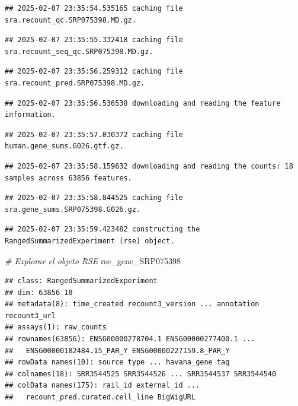 \documentclass[
]{article}
\newenvironment{Shaded}{\begin{snugshade}}{\end{snugshade}}
\newcommand{\CommentTok}[1]{\textcolor[rgb]{0.56,0.35,0.01}{\textit{#1}}}
\newcommand{\NormalTok}[1]{#1}
\begin{document}
\begin{verbatim}
## 2025-02-07 23:35:54.535165 caching file sra.recount_qc.SRP075398.MD.gz.
\end{verbatim}

\begin{verbatim}
## 2025-02-07 23:35:55.332418 caching file sra.recount_seq_qc.SRP075398.MD.gz.
\end{verbatim}

\begin{verbatim}
## 2025-02-07 23:35:56.259312 caching file sra.recount_pred.SRP075398.MD.gz.
\end{verbatim}

\begin{verbatim}
## 2025-02-07 23:35:56.536538 downloading and reading the feature information.
\end{verbatim}

\begin{verbatim}
## 2025-02-07 23:35:57.030372 caching file human.gene_sums.G026.gtf.gz.
\end{verbatim}

\begin{verbatim}
## 2025-02-07 23:35:58.159632 downloading and reading the counts: 18 samples across 63856 features.
\end{verbatim}

\begin{verbatim}
## 2025-02-07 23:35:58.844525 caching file sra.gene_sums.SRP075398.G026.gz.
\end{verbatim}

\begin{verbatim}
## 2025-02-07 23:35:59.423482 constructing the RangedSummarizedExperiment (rse) object.
\end{verbatim}

\begin{Shaded}
\begin{Highlighting}[]
\CommentTok{\# Explorar el objeto RSE}
\NormalTok{rse\_gene\_SRP075398}
\end{Highlighting}
\end{Shaded}

\begin{verbatim}
## class: RangedSummarizedExperiment 
## dim: 63856 18 
## metadata(8): time_created recount3_version ... annotation recount3_url
## assays(1): raw_counts
## rownames(63856): ENSG00000278704.1 ENSG00000277400.1 ...
##   ENSG00000182484.15_PAR_Y ENSG00000227159.8_PAR_Y
## rowData names(10): source type ... havana_gene tag
## colnames(18): SRR3544525 SRR3544526 ... SRR3544537 SRR3544540
## colData names(175): rail_id external_id ...
##   recount_pred.curated.cell_line BigWigURL
\end{verbatim}
\end{document}
